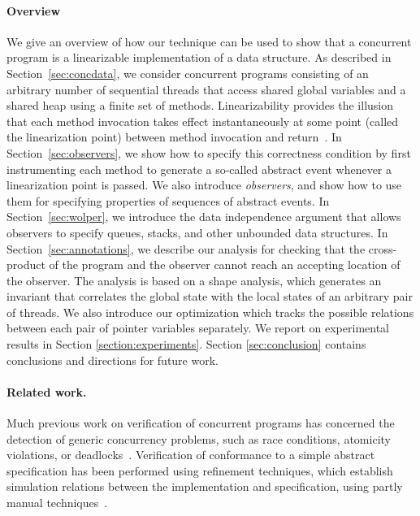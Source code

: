\paragraph{Overview} We give an overview of how our technique can be used
to show that a concurrent program is a linearizable
implementation of a data structure.
As described in Section~\ref{sec:concdata}, we consider concurrent programs
consisting of an arbitrary number of
sequential threads that access shared global variables and a shared heap using
a finite set of methods.
Linearizability provides the illusion that each
method invocation takes effect instantaneously at some point (called the
linearization point) between method invocation and
return~\cite{HeWi:linearizability}.
In Section~\ref{sec:observers}, we show how to specify this
correctness condition by first instrumenting each method to generate a
so-called abstract event whenever a linearization point is passed.
We also introduce {\em observers}, and show how to use them for specifying
properties of sequences of abstract events.
In Section~\ref{sec:wolper}, we introduce the data independence argument that
allows observers to specify queues, stacks, and other
unbounded data structures.
In Section~\ref{sec:annotations}, we describe our analysis for checking that
the cross-product of the program and the observer cannot reach an accepting
location of the observer. The analysis is based on a shape analysis, which
generates an invariant that correlates
the global state with the local states of an arbitrary pair of threads.
We also introduce our optimization which tracks
the possible relations between each pair of pointer variables separately.
We report on experimental results in Section \ref{section:experiments}. Section \ref{sec:conclusion} contains conclusions and
directions for future work. 
%




\paragraph{Related work.}
Much previous work on verification of concurrent programs has concerned the
detection of generic concurrency problems, such as race conditions,
atomicity violations, or deadlocks~\cite{FlFr:atomizer:journal,NAW:pldi06,NPSG:icse09}.
Verification of conformance to a simple abstract specification has
been performed using
refinement techniques, which establish simulation relations %
between the implementation and specification, using partly manual
techniques~\cite{Doherty:lockfree,CGLM:cav06,EQSST:tacas10,WaSt:ppopp05}.

